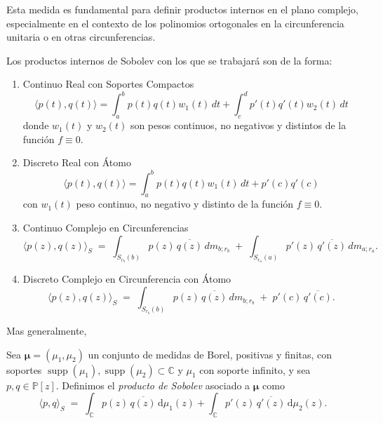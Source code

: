 Esta medida es fundamental para definir productos internos en el plano complejo, especialmente en el contexto de los polinomios ortogonales en la circunferencia unitaria o en otras circunferencias.

Los productos internos de Sobolev con los que se trabajará son de la forma:
\begin{enumerate}
	\item Continuo Real con Soportes Compactos
	      \begin{equation}
		      \langle p(t), q(t) \rangle = \int_{a}^{b} p(t) q(t) w_1(t) \, dt + \int_{c}^{d} p'(t) q'(t) w_2(t) \, dt
	      \end{equation}
	      donde $w_1(t)$ y $w_2(t)$ son pesos continuos, no negativos y distintos de la función $f \equiv 0$.
	\item Discreto Real con Átomo
	      \begin{equation}
		      \langle p(t), q(t) \rangle = \int_{a}^{b} p(t) q(t) w_1(t) \, dt + p'(c) q'(c)
	      \end{equation}
	      con $w_1(t)$ peso continuo, no negativo y distinto de la función $f \equiv 0$.
	\item Continuo Complejo en Circunferencias
	      \begin{equation}
		      \langle p(z) , q(z) \rangle_{S}\;=\;
		      \int_{S_{r_b}(b)}     p(z)\,\overline{q(z)} \, dm_{b;r_b}
		      \;+\;
		      \int_{S_{r_a}(a)}
		      p'(z)\,\overline{q'(z)} \, dm_{a;r_a}.
	      \end{equation}
	\item Discreto Complejo en Circunferencia con Átomo
	      \begin{equation}
		      \langle p(z) , q(z) \rangle_{S}\;=\;
		      \int_{S_{r_b}(b)} p(z)\,\overline{q(z)}\,dm_{b;r_b}
		      \;+\;
		      p'(c)\,\overline{q'(c)}.
	      \end{equation}
\end{enumerate}

Mas generalmente,
\begin{definition}\label{def:sobolev_product}
	\cite{escribano2025boundedness}
	Sea \(\boldsymbol{\mu}=(\mu_1,\mu_2)\) un conjunto de medidas de Borel,
	positivas y finitas, con soportes \(\operatorname{supp}(\mu_1),\operatorname{supp}(\mu_2)\subset\mathbb C\) y \( \mu_1\) con soporte infinito,
	y sea \(p,q\in\mathbb P[z]\).
	Definimos el \emph{producto de Sobolev} asociado a
	\(\boldsymbol{\mu}\) como
	\[
		\langle p,q \rangle_{S}
		\;=\;
		\int_{\mathbb C} p(z)\,\overline{q(z)}\,\mathrm d\mu_{1}(z) + \int_{\mathbb C} p'(z)\,\overline{q'(z)}\,\mathrm d\mu_{2}(z).
	\]
\end{definition}

